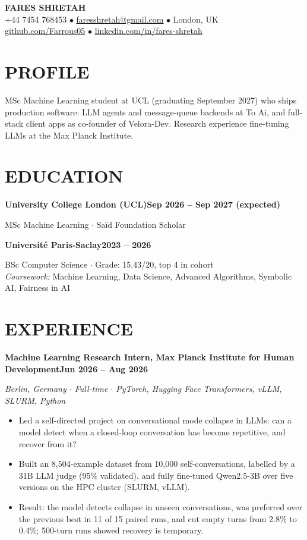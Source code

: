 \documentclass[10pt, a4paper]{article}
\newcommand{\entry}[2]{\vspace{5pt}\textbf{#1}\hfill\textbf{#2}\par}
\newcommand{\sub}[1]{\textit{#1}\par}
\begin{document}
\begin{center}
    {\huge \textbf{FARES SHRETAH}} \\[3pt]
    \small +44 7454 768453 $\bullet$ \href{mailto:faresshretah@gmail.com}{faresshretah@gmail.com} $\bullet$ London, UK \\
    \small \href{https://github.com/Farrous05}{github.com/Farrous05} $\bullet$ \href{https://www.linkedin.com/in/fares-shretah/}{linkedin.com/in/fares-shretah}
\end{center}

\section*{PROFILE}
MSc Machine Learning student at UCL (graduating September 2027) who ships production software: LLM agents and message-queue backends at To Ai, and full-stack client apps as co-founder of Velora-Dev. Research experience fine-tuning LLMs at the Max Planck Institute.

\section*{EDUCATION}
\entry{University College London (UCL)}{Sep 2026 -- Sep 2027 (expected)}
MSc Machine Learning $\cdot$ Sa\"id Foundation Scholar

\entry{Universit\'e Paris-Saclay}{2023 -- 2026}
BSc Computer Science $\cdot$ Grade: 15.43/20, top 4 in cohort \\
\textit{Coursework:} Machine Learning, Data Science, Advanced Algorithms, Symbolic AI, Fairness in AI

\section*{EXPERIENCE}
\entry{Machine Learning Research Intern, Max Planck Institute for Human Development}{Jun 2026 -- Aug 2026}
\sub{Berlin, Germany $\cdot$ Full-time $\cdot$ PyTorch, Hugging Face Transformers, vLLM, SLURM, Python}
\begin{itemize}
    \item Led a self-directed project on conversational mode collapse in LLMs: can a model detect when a closed-loop conversation has become repetitive, and recover from it?
    \item Built an 8,504-example dataset from 10,000 self-conversations, labelled by a 31B LLM judge (95\% validated), and fully fine-tuned Qwen2.5-3B over five versions on the HPC cluster (SLURM, vLLM).
    \item Result: the model detects collapse in unseen conversations, was preferred over the previous best in 11 of 15 paired runs, and cut empty turns from 2.8\% to 0.4\%; 500-turn runs showed recovery is temporary.
\end{itemize}
\end{document}

